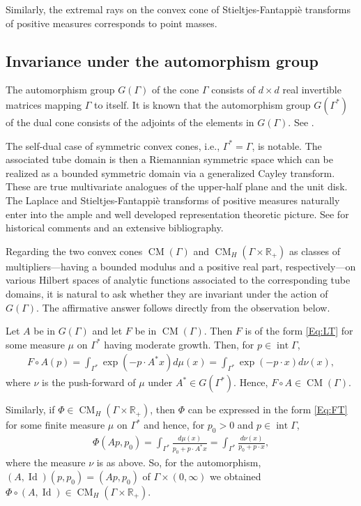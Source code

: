\documentclass[11pt,reqno]{amsart}
\theoremstyle{plain}
\theoremstyle{definition}
\numberwithin{equation}{section}
\newcommand{\R}{\mathbb{R}}
\begin{document}
	Similarly, the extremal rays on the convex cone of Stieltjes-Fantappi\`e transforms of positive measures corresponds to point masses.
	
	\subsection{Invariance under the automorphism group}
The automorphism group $G(\Gamma)$ of the cone $\Gamma$ consists of $d \times d$ real invertible matrices mapping $\Gamma$ to itself. It is known that the automorphism group $G(\Gamma^*)$ of the dual cone consists of the adjoints of the elements in $G(\Gamma)$. See \cite[Chapter I]{Faraut-Koranyi}. 

The self-dual case of symmetric convex cones, i.e., $\Gamma^\ast = \Gamma$, is notable. The associated tube domain is then a Riemannian symmetric space
which can be realized as a bounded symmetric domain via a generalized Cayley transform. These are true multivariate analogues of the upper-half plane and the unit disk.
The Laplace and Stieltjes-Fantappi\`e transforms of positive measures naturally enter into the ample and well developed representation theoretic picture. See \cite{Faraut-Koranyi} for historical comments and an extensive bibliography.

Regarding the two convex cones $\operatorname{CM}(\Gamma)$ and $\operatorname{CM}_H(\Gamma\times \R_+)$ as classes of multipliers—having a bounded modulus and a positive real part, respectively—on various Hilbert spaces of analytic functions associated to the corresponding tube domains, it is natural to ask whether they are invariant under the action of $G(\Gamma).$ The affirmative answer follows directly from the observation below.

Let $A$ be in $G(\Gamma)$ and let $F$ be in $\operatorname{CM}(\Gamma)$. Then $F$ is of the form \eqref{Eq:LT} for some measure $\mu$ on $\Gamma^*$ having moderate growth. Then, for $p\in \operatorname{int} \Gamma$,
\begin{align*}
    F\circ A (p) = \int_{\Gamma^*} \exp{(- p \cdot A^*x)} d\mu(x) = \int_{\Gamma^*} \exp{(- p \cdot x)} d\nu(x),
\end{align*}
where $\nu$ is the push-forward of $\mu$ under $A^* \in G(\Gamma^*)$. Hence, $F\circ A \in \operatorname{CM}(\Gamma)$.

Similarly, if $\Phi \in \operatorname{CM}_H(\Gamma\times \R_+)$, then $\Phi$ can be expressed in the form \eqref{Eq:FT} for some finite measure $\mu$ on $\Gamma^*$ and hence, for $p_0>0$ and $p\in \operatorname{int} \Gamma$,
\begin{align*}
    \Phi (Ap, p_0) = \int_{\Gamma^*} \frac{d\mu(x)}{p_0 + p \cdot A^*x} = \int_{\Gamma^*} \frac{d\nu(x)}{p_0 + p \cdot x},
\end{align*}
where the measure $\nu$ is as above. So, for the automorphism, $(A, \operatorname{Id})(p, p_0) = (Ap, p_0)$ of $\Gamma \times (0, \infty)$ we obtained
$\Phi \circ (A, \operatorname{Id}) \in \operatorname{CM}_H(\Gamma\times \R_+)$.
\end{document}
